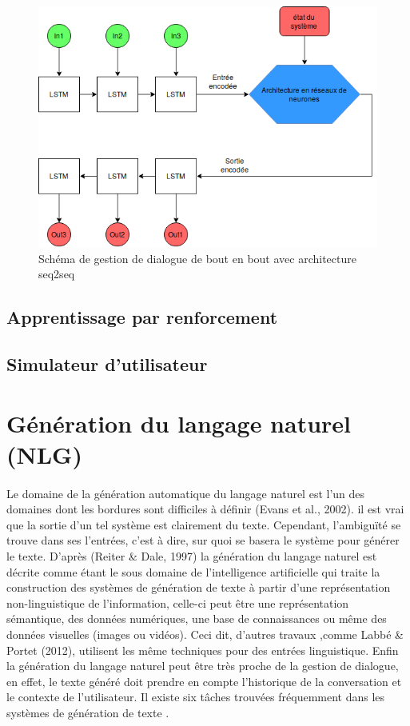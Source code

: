 \begin{figure}[H]
	\centering
	\includegraphics[width=.7\linewidth]{images/DM/DMSeq2Seq.png} 
	\caption{Schéma de gestion de dialogue de bout en bout avec architecture seq2seq} 
\end{figure}
\subsection{Apprentissage par renforcement}
\subsection{Simulateur d'utilisateur}
\section{Génération du langage naturel (NLG)}\label{NLG}
	\paragraph{}
	Le domaine de la génération automatique du langage naturel est l’un des domaines dont les bordures sont difficiles à définir (Evans et al., 2002). il est vrai que la sortie d’un tel système est clairement du texte. Cependant, l’ambiguïté se trouve dans ses l’entrées, c’est à dire, sur quoi se basera le système pour générer le texte. D’après (Reiter \& Dale, 1997)\cite{Reiter:1997} la génération du langage naturel est décrite comme étant le sous domaine de l’intelligence artificielle qui traite la construction des systèmes de génération de texte à partir d’une représentation non-linguistique de l’information, celle-ci peut être une représentation sémantique, des données numériques, une base de connaissances ou même des données visuelles (images ou vidéos). Ceci dit, d’autres travaux ,comme Labbé \& Portet (2012)\cite{Labbé2012}, utilisent les même techniques pour des entrées linguistique. Enfin la génération du langage naturel peut être très proche de la gestion de dialogue\cite{Dethlefs2014}, en effet, le texte généré doit prendre en compte l’historique de la conversation et le contexte de l’utilisateur.\newline
	Il existe six tâches trouvées fréquemment dans les systèmes de génération de texte \cite{Reiter:1997}.
	
